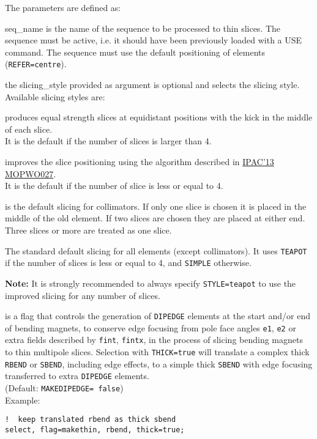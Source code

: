 The parameters are defined as: 
\begin{madlist}
    seq\_name is the name of the sequence to be
   processed to thin slices. The sequence must be active, i.e. it should
   have been previously loaded with a USE command.  The sequence must
   use the default positioning of elements ({\tt REFER=centre}). 

    the slicing\_style provided as argument is optional
   and selects the slicing style. Available slicing styles are:     

     \begin{madlist}
       produces equal strength slices at equidistant
     positions with the kick in the middle of each slice. \\ 
     It is the default if the number of slices is larger than 4. 

      improves the slice positioning using the algorithm
     described in
     \href{http://accelconf.web.cern.ch/AccelConf/IPAC2013/papers/mopwo027.pdf}{IPAC'13 MOPWO027}.\\
     It is the default if the number of slice is less or equal to 4.

      is the default slicing for collimators. If only
     one slice is chosen it is placed in the middle of the old
     element. If two slices are chosen they are placed at either
     end. Three slices or more are treated as one slice.      

      The standard default slicing for all
     elements (except collimators). It uses {\tt TEAPOT} if the number
     of slices is less or equal to 4, and {\tt SIMPLE} otherwise.
     \end{madlist}
 
   \textbf{Note:} It is strongly recommended to always specify {\tt STYLE=teapot}  
   to use the improved slicing for any number of slices.
      
    is a flag that controls the generation of
   {\tt DIPEDGE} elements at the start and/or end of bending magnets,
   to conserve edge focusing from pole face angles {\tt e1}, {\tt e2}
   or extra fields described by {\tt fint}, {\tt fintx}, in the
   process of slicing bending magnets to thin multipole slices.   
   Selection with {\tt THICK=true} will translate a complex thick 
   {\tt RBEND} or {\tt SBEND}, including edge effects, to a simple
   thick {\tt SBEND} with edge focusing transferred to extra 
   {\tt DIPEDGE} elements. \\ 
   (Default: {\tt MAKEDIPEDGE= false}) \\
   Example:
\begin{verbatim}
!  keep translated rbend as thick sbend
select, flag=makethin, rbend, thick=true;
\end{verbatim}


\end{madlist}

